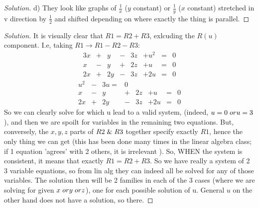 \documentclass{article}
\newenvironment{problem}[2][Problem]{\begin{trivlist}
\item[\hskip \labelsep {\bfseries #1}\hskip \labelsep {\bfseries #2.}]}{\end{trivlist}}
\newenvironment{solution}{\begin{proof}[Solution]}{\end{proof}}
\begin{document}
\begin{solution}
    d) They look like graphs of $\frac{1}{x}$ ($y$ constant) or $\frac{1}{y}$ ($x$ constant) stretched in v direction by $\frac{1}{2}$ and shifted depending on where exactly the thing is parallel.
\end{solution}
\begin{problem}{9.19}
\end{problem}
\begin{solution}
    It is visually clear that $R1 = R2 + R3$, exlcuding the $R(u)$ component. I.e, taking $R1 \rightarrow R1 - R2 - R3$:
    \[
    \begin{alignat*}{4}
            3x & + &  y & - & 3z & + u^{2} & = & 0 \\
             x & - &  y & + &  2z & + u & = &  0\\
             2x & + & 2y & - & 3z & + 2u & = & 0
     \end{alignat*}
     \]
     \[
     \begin{alignat*}{4}
        u^{2} & - & 3u = & 0 \\
         x & - &  y & + &  2z & + u & = & 0  \\
         2x & + & 2y & - & 3z & + 2u & = & 0
 \end{alignat*}
    \]
    So we  can clearly solve for which u lead to a valid system, (indeed, $u = 0 \hspace{1mm} or u = 3$), and then we are spoilt for variables in the remaining two equations. But, conversely, the $x, y, z$ parts of $R2 \hspace{1mm} \& \hspace{1mm} R3$ together specify exactly $R1$, hence the only thing we can get (this has been done many times in the linear algebra class; if 1 equation 'agrees' with 2 others, it is irrelevant ). So, WHEN the system is consistent, it means that exactly $R1 = R2 +R3$. So we have really a system of 2 3 variable equations, so from lin alg they can indeed all be solved for any of those variables. The solution then will be 2 families in each of the 3 cases (where we are solving for given $x \hspace{1mm} or y \hspace{1mm} or z$), one for each possible solution of u. General $u$ on the other hand does not have a solution, so there.
\end{solution}
\end{document}
